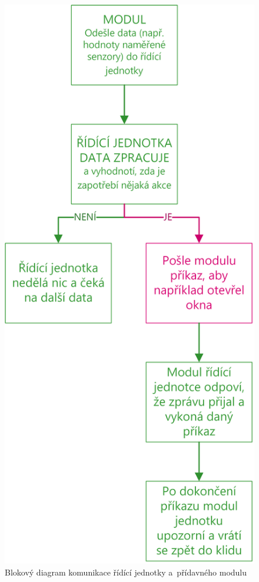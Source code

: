 \begin{figure}[h]
    \centering
    \includegraphics[scale=0.9]{img/SOFTWARE/KOMUNIKACE_MODULU.png}
    \caption{Blokový diagram komunikace řídící jednotky a~přídavného modulu}
    \label{fig:PPCU-to-MODULE-communication}
\end{figure}

\newpage